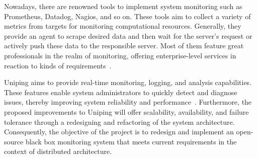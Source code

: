 Nowadays, there are renowned tools to implement system monitoring such as Prometheus, Datadog, Nagios, and so on. These tools aim to collect a variety of metrics from targets for monitoring computational resources. Generally, they provide an agent to scrape desired data and then wait for the server's request or actively push these data to the responsible server. Most of them feature great professionals in the realm of monitoring, offering enterprise-level services in reaction to kinds of requirements~\parencite{neves_detailed_2021}.

Uniping aims to provide real-time monitoring, logging, and analysis capabilities. These features enable system administrators to quickly detect and diagnose issues, thereby improving system reliability and performance~\parencite{jorgensen_software_2021}. Furthermore, the proposed improvements to Uniping will offer scalability, availability, and failure tolerance through a redesigning and refactoring of the system architecture. Consequently, the objective of the project is to redesign and implement an open-source black box monitoring system that meets current requirements in the context of distributed architecture.
